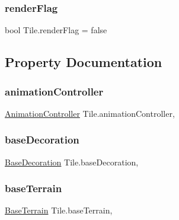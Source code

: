 \subsubsection{\texorpdfstring{renderFlag}{renderFlag}}
{\footnotesize\ttfamily bool Tile.\+render\+Flag = false}



\subsection{Property Documentation}
\mbox{\label{class_tile_a539da027add6656c04726ee3f8c169a3}} 
\subsubsection{\texorpdfstring{animationController}{animationController}}
{\footnotesize\ttfamily \mbox{\hyperlink{class_animation_controller}{Animation\+Controller}} Tile.\+animation\+Controller\hspace{0.3cm}{\ttfamily [get]}, {\ttfamily [set]}}

\mbox{\label{class_tile_a73a26ee1d73d9418cf55d4a8ec585910}} 
\subsubsection{\texorpdfstring{baseDecoration}{baseDecoration}}
{\footnotesize\ttfamily \mbox{\hyperlink{class_base_decoration}{Base\+Decoration}} Tile.\+base\+Decoration\hspace{0.3cm}{\ttfamily [get]}, {\ttfamily [set]}}

\mbox{\label{class_tile_a36dba2c580e50ce450df4a0b58d69130}} 
\subsubsection{\texorpdfstring{baseTerrain}{baseTerrain}}
{\footnotesize\ttfamily \mbox{\hyperlink{class_base_terrain}{Base\+Terrain}} Tile.\+base\+Terrain\hspace{0.3cm}{\ttfamily [get]}, {\ttfamily [set]}}

